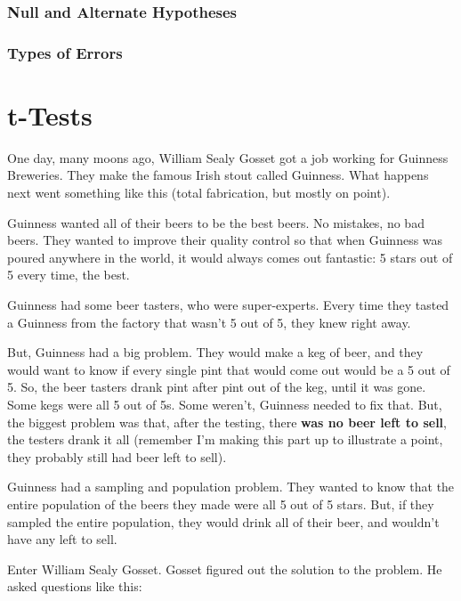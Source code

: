 \documentclass[
]{book}
\begin{document}
\hypertarget{null-and-alternate-hypotheses}{%
\subsection{Null and Alternate Hypotheses}\label{null-and-alternate-hypotheses}}

\hypertarget{types-of-errors}{%
\subsection{Types of Errors}\label{types-of-errors}}

\hypertarget{t-tests}{%
\chapter{t-Tests}\label{t-tests}}

One day, many moons ago, William Sealy Gosset got a job working for Guinness Breweries. They make the famous Irish stout called Guinness. What happens next went something like this (total fabrication, but mostly on point).

Guinness wanted all of their beers to be the best beers. No mistakes, no bad beers. They wanted to improve their quality control so that when Guinness was poured anywhere in the world, it would always comes out fantastic: 5 stars out of 5 every time, the best.

Guinness had some beer tasters, who were super-experts. Every time they tasted a Guinness from the factory that wasn't 5 out of 5, they knew right away.

But, Guinness had a big problem. They would make a keg of beer, and they would want to know if every single pint that would come out would be a 5 out of 5. So, the beer tasters drank pint after pint out of the keg, until it was gone. Some kegs were all 5 out of 5s. Some weren't, Guinness needed to fix that. But, the biggest problem was that, after the testing, there \textbf{was no beer left to sell}, the testers drank it all (remember I'm making this part up to illustrate a point, they probably still had beer left to sell).

Guinness had a sampling and population problem. They wanted to know that the entire population of the beers they made were all 5 out of 5 stars. But, if they sampled the entire population, they would drink all of their beer, and wouldn't have any left to sell.

Enter William Sealy Gosset. Gosset figured out the solution to the problem. He asked questions like this:
\end{document}
